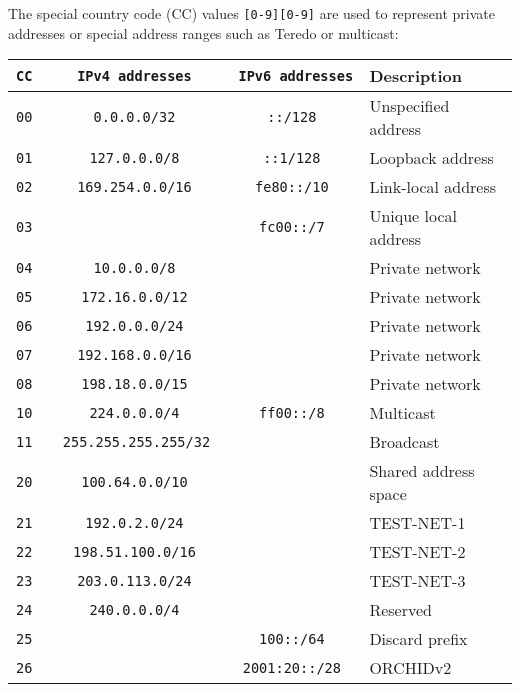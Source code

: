 \documentclass[documentation]{subfiles}
\begin{document}
The special country code (CC) values {\tt [0-9][0-9]} are used to represent private addresses or special address ranges such as Teredo or multicast:

\begin{center}
    \begin{tabular}{>{\tt}r>{\tt}c>{\tt}cl}
        \toprule
        {\bf CC} & {\bf IPv4 addresses} & {\bf IPv6 addresses} & {\bf Description}\\
        \midrule
        00       & 0.0.0.0/32           & ::/128               & Unspecified address\\
        01       & 127.0.0.0/8          & ::1/128              & Loopback address\\
        02       & 169.254.0.0/16       & fe80::/10            & Link-local address\\
        03       &                      & fc00::/7             & Unique local address\\
        04       & 10.0.0.0/8           &                      & Private network\\
        05       & 172.16.0.0/12        &                      & Private network\\
        06       & 192.0.0.0/24         &                      & Private network\\
        07       & 192.168.0.0/16       &                      & Private network\\
        08       & 198.18.0.0/15        &                      & Private network\\
        10       & 224.0.0.0/4          & ff00::/8             & Multicast\\
        11       & 255.255.255.255/32   &                      & Broadcast\\
        20       & 100.64.0.0/10        &                      & Shared address space\\
        21       & 192.0.2.0/24         &                      & TEST-NET-1\\
        22       & 198.51.100.0/16      &                      & TEST-NET-2\\
        23       & 203.0.113.0/24       &                      & TEST-NET-3\\
        24       & 240.0.0.0/4          &                      & Reserved\\
        25       &                      & 100::/64             & Discard prefix\\
        26       &                      & 2001:20::/28         & ORCHIDv2\\

\end{tabular}
\end{center}
\end{document}
